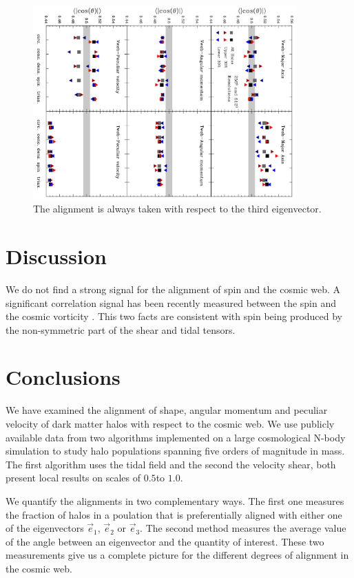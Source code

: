 \documentclass[useAMS,usenatbib]{mn2e}
\newcommand{\hMpc}{{\ifmmode{h^{-1}{\rm Mpc}}\else{$h^{-1}$Mpc }\fi}}
\begin{document}
\begin{figure}
\includegraphics[width=0.90\textwidth,angle=90]{Fig6.pdf}
\caption{The alignment is always taken with respect to the third eigenvector.}
\end{figure}
\section{Discussion}
\label{sec:discussion}


We do not find a strong signal for the alignment of spin and the
cosmic web. A significant correlation signal has been recently
measured between the spin and the cosmic vorticity
\citep{Libeskind2013b,Laigle2013}. This two facts are consistent with
spin being produced by the non-symmetric part of the shear and tidal
tensors.  




\section{Conclusions}
\label{sec:conclusions}

We have examined the alignment of shape, angular momentum and peculiar
velocity of dark matter halos with respect to the cosmic web. We use
publicly available data from two algorithms implemented on a large
cosmological N-body simulation to study halo populations spanning five
orders of magnitude in mass. The first algorithm uses the tidal field
and the second the velocity shear, both present local results on
scales of $0.5$\hMpc to $1.0$\hMpc.  

We quantify the alignments in two complementary ways. The first one
measures the fraction of halos in a poulation that is preferentially
aligned with either one of the eigenvectors $\vec{e}_1$, $\vec{e}_2$
or $\vec{e}_3$. The second method measures the average value of the
angle between an eigenvector and the quantity of interest. These two
measurements give us a complete picture for the different degrees of
alignment in the cosmic web. 
\end{document}
